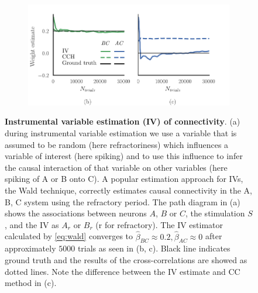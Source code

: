 \documentclass[11pt]{article}
\begin{document}
\begin{figure}
\makeatletter
\renewcommand\p@subfigure{}
\makeatother
\begin{subfigure}{\textwidth} \centering
{}
\caption{} \label{fig:cch_iv_triple:0}
\end{subfigure}\medskip\\
\begin{subfigure}{\textwidth} 
\includegraphics[scale=1]{triple}
\end{subfigure}
\caption{{\bf Instrumental variable estimation (IV) of connectivity}. 
(a) during instrumental variable estimation we use a variable that is assumed to be random (here refractoriness) which influences a variable of interest (here spiking) and to use this influence to infer the causal interaction of that variable on other variables (here spiking of A or B onto C). 
A popular estimation approach for IVs, the Wald technique, correctly estimates causal connectivity in the A, B, C system using the refractory period. 
The path diagram in (a) shows the associations between neurons $ A $, $ B $ or $ C $, the stimulation $ S $, and the IV as $ A_{r} $ or $ B_{r} $ (r for refractory).
The IV estimator calculated by \cref{eq:wald} converges to $ \hat{\beta}_{BC} \approx 0.2, \hat{\beta}_{AC} \approx 0 $ after approximately $ 5000 $ trials as seen in (b, c). 
Black line indicates ground truth and the results of the cross-correlations are showed as dotted lines. 
Note the difference between the IV estimate and CC method in (c).}
\label{fig:cch_iv_triple}
\end{figure}
\FloatBarrier
\end{document}
